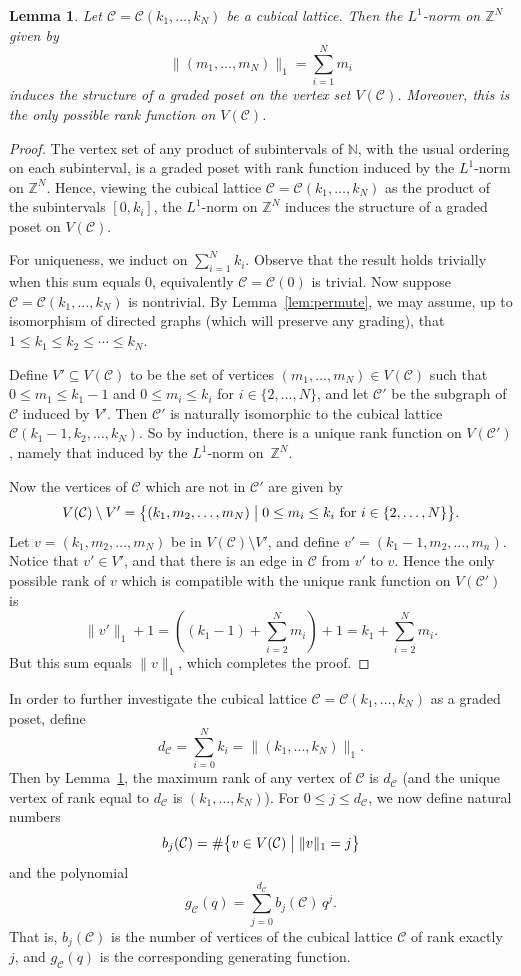 \documentclass[11pt]{amsart}
\theoremstyle{plain}
\newtheorem{lemma}[thm]{Lemma}
\theoremstyle{definition}
\newcommand{\cC}{\mathcal{C}}
\newcommand{\Z}{\mathbb{Z}}
\newcommand{\N}{\mathbb{N}}
\numberwithin{equation}{subsection}
\begin{document}
\begin{lemma}\label{lem:cubicalRank} 
Let $\cC = \cC(k_1, \dots, k_N)$ be a cubical lattice. Then the $L^1$-norm on $\Z^N$ given by
\[ \| (m_1, \dots, m_N) \|_1 = \sum_{i = 1}^N m_i \]
induces the structure of a graded poset on the vertex set $V(\cC)$. Moreover, this is the only possible rank function on $V(\cC)$.
 \end{lemma}
\begin{proof} The vertex set of any product of subintervals of $\N$, with the usual ordering on each subinterval, is a graded poset with rank function induced by the $L^1$-norm on $\Z^N$. Hence, viewing the cubical lattice $\cC=\cC(k_1,\dots,k_N)$ as the product of the subintervals $[0,k_i]$, the $L^1$-norm on $\Z^N$ induces the structure of a graded poset on $V(\cC)$. 

For uniqueness, we induct on $\sum_{i=1}^N k_i$. Observe that the result holds trivially when this sum equals $0$, equivalently $\cC = \cC(0)$ is trivial. Now suppose $\cC = \cC(k_1,\dots,k_N)$ is nontrivial. By Lemma~\ref{lem:permute}, we may assume, up to isomorphism of directed graphs (which will preserve any grading), that $1 \leq k_1 \leq k_2 \leq \cdots \leq k_N$. 

Define $V' \subseteq V(\cC)$ to be the set of vertices $(m_1, \dots, m_N) \in V(\cC)$ such that $0 \leq m_1 \leq k_1 - 1$ and $0 \leq m_i \leq k_i$ for $i \in \{2,\dots,N\}$, and let $\cC'$ be the subgraph of $\cC$ induced by $V'$. Then $\cC'$ is naturally isomorphic to the cubical lattice $\cC(k_1 - 1,k_{2},\dots,k_N)$. So by induction, there is a unique rank function on $V(\cC')$, namely that induced by the $L^1$-norm on~$\Z^N$.

Now the vertices of $\cC$ which are not in $\cC'$ are given by \[ V(\cC) \setminus V' = \bigl\{ (k_1,m_2,\dots,m_N) \bigm| 0 \leq m_i \leq k_i \text{ for }i \in \{2,\dots,N\} \bigr\}.\] Let $v = (k_1,m_2,\dots,m_N)$ be in $V(\cC) \setminus V'$, and define $v' = (k_1 - 1,m_2,\dots,m_n)$. Notice that $v' \in V'$, and that there is an edge in $\cC$ from $v'$ to $v$. Hence the only possible rank of $v$ which is compatible with the unique rank function on $V(\cC')$ is
\[
\| v' \|_1 + 1 = \left( (k_1 - 1) + \sum_{i=2}^N m_i \right) + 1 = k_1 + \sum_{i=2}^N m_i .
\]
But this sum equals $\| v \|_1$, which completes the proof.
\end{proof}

In order to further investigate the cubical lattice $\cC = \cC(k_1, \dots, k_N)$ as a graded poset, define \[ d_\cC = \sum_{i=0}^N k_i = \| (k_1,\dots,k_N) \|_1.\] Then by Lemma~\ref{lem:cubicalRank}, the maximum rank of any vertex of $\cC$ is $d_\cC$ (and the unique vertex of rank equal to $d_\cC$ is $(k_1,\dots,k_N)$). For $0 \leq j \leq d_\cC$, we now define natural numbers
\[
b_j(\cC) = \# \bigl\{ v \in V(\cC) \bigm| \| v \|_1 = j \bigr\}
\]
and the polynomial 
\[
g_\cC(q) = \sum_{j=0}^{d_\cC} b_j(\cC) \,q^j.
\]
That is, $b_j(\cC)$ is the number of vertices of the cubical lattice $\cC$ of rank exactly $j$, and $g_\cC(q)$ is the corresponding generating function. 
\end{document}

